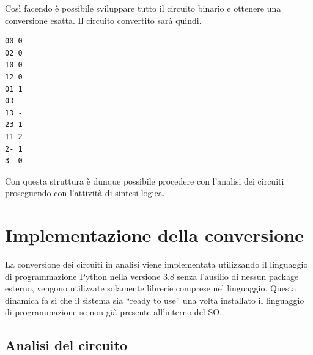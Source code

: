 \documentclass[
  italian,
]{book}
\begin{document}
\newpage

Così facendo è possibile sviluppare tutto il circuito binario e ottenere una conversione esatta. Il circuito convertito
sarà quindi.

\begin{verbatim}
00 0
02 0
10 0
12 0
01 1
03 -
13 -
23 1
11 2
2- 1
3- 0
\end{verbatim}

Con questa struttura è dunque possibile procedere con l'analisi dei circuiti proseguendo con l'attività di sintesi logica.

\hypertarget{implementazione-della-conversione}{%
\section{Implementazione della conversione}\label{implementazione-della-conversione}}

La conversione dei circuiti in analisi viene implementata utilizzando il linguaggio di programmazione Python nella versione 3.8 senza l'ausilio di nessun package esterno, vengono utilizzate solamente librerie comprese nel linguaggio. Questa dinamica fa si che il sistema sia ``ready to use'' una volta installato il linguaggio di programmazione se non già presente all'interno del SO.

\hypertarget{analisi-del-circuito}{%
\subsection{Analisi del circuito}\label{analisi-del-circuito}}
\end{document}
